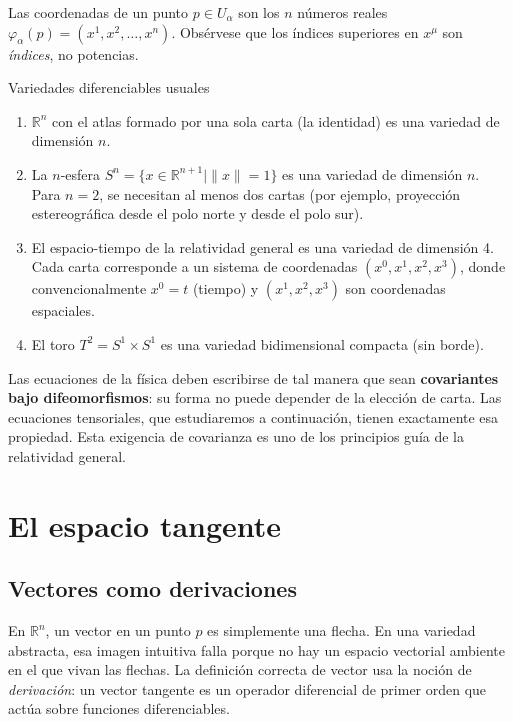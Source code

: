 Las coordenadas de un punto $p \in U_\alpha$ son los $n$ números reales $\varphi_\alpha(p) = (x^1, x^2, \ldots, x^n)$. Obsérvese que los índices superiores en $x^\mu$ son \emph{índices}, no potencias.

\begin{ejemplo}{Variedades diferenciables usuales}{}
\begin{enumerate}[leftmargin=2em, label=(\alph*)]
  \item $\mathbb{R}^n$ con el atlas formado por una sola carta (la identidad) es una variedad de dimensión $n$.
  \item La $n$-esfera $S^n = \{x \in \mathbb{R}^{n+1} \mid \|x\|=1\}$ es una variedad de dimensión $n$. Para $n=2$, se necesitan al menos dos cartas (por ejemplo, proyección estereográfica desde el polo norte y desde el polo sur).
  \item El espacio-tiempo de la relatividad general es una variedad de dimensión 4. Cada carta corresponde a un sistema de coordenadas $(x^0, x^1, x^2, x^3)$, donde convencionalmente $x^0 = t$ (tiempo) y $(x^1, x^2, x^3)$ son coordenadas espaciales.
  \item El toro $T^2 = S^1 \times S^1$ es una variedad bidimensional compacta (sin borde).
\end{enumerate}
\end{ejemplo}

\begin{importante}
Las ecuaciones de la física deben escribirse de tal manera que sean \textbf{covariantes bajo difeomorfismos}: su forma no puede depender de la elección de carta. Las ecuaciones tensoriales, que estudiaremos a continuación, tienen exactamente esa propiedad. Esta exigencia de covarianza es uno de los principios guía de la relatividad general.
\end{importante}

\section{El espacio tangente}

\subsection{Vectores como derivaciones}

En $\mathbb{R}^n$, un vector en un punto $p$ es simplemente una flecha. En una variedad abstracta, esa imagen intuitiva falla porque no hay un espacio vectorial ambiente en el que vivan las flechas. La definición correcta de vector usa la noción de \emph{derivación}: un vector tangente es un operador diferencial de primer orden que actúa sobre funciones diferenciables.

